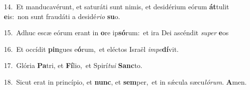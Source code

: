 {\numbfont\textcolor{\numbcolor}{14.}}~Et manducavérunt, et saturáti sunt nimis, et desidérium eórum \textbf{át}\-tulit \textbf{e}\-is:~\star non sunt fraudáti a desidé\-\textit{ri}\-\textit{o} \textbf{su}\-o.\par
{\numbfont\textcolor{\numbcolor}{15.}}~Adhuc escæ eórum erant in \textbf{o}\-re ip\-\textbf{só}\-rum:~\star et ira Dei ascéndit \textit{su}\-\textit{per} \textbf{e}\-os\par
{\numbfont\textcolor{\numbcolor}{16.}}~Et occídit \textbf{pin}\-gues e\-\textbf{ó}\-rum,~\star et eléctos Israël \textit{im}\-\textit{pe}\textbf{dí}vit.\par
{\numbfont\textcolor{\numbcolor}{17.}}~Glória \textbf{Pa}\-tri, et \textbf{Fí}\-lio,~\star et Spirí\-\textit{tu}\-\textit{i} \textbf{Sanc}\-to.\par
{\numbfont\textcolor{\numbcolor}{18.}}~Sicut erat in princípio, et \textbf{nunc}\-, et \textbf{sem}\-per,~\star et in sǽcula sæcu\-\textit{ló}\-\textit{rum}. \textbf{A}\-men.\par
